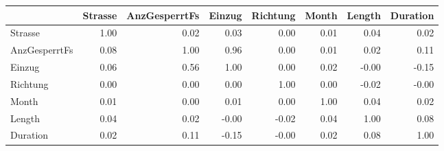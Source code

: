 \begin{tabular}{lrrrrrrr}
\toprule
{} &  Strasse &  AnzGesperrtFs &  Einzug &  Richtung &  Month &  Length &  Duration \\
\midrule
Strasse       &     1.00 &           0.02 &    0.03 &      0.00 &   0.01 &    0.04 &      0.02 \\
AnzGesperrtFs &     0.08 &           1.00 &    0.96 &      0.00 &   0.01 &    0.02 &      0.11 \\
Einzug        &     0.06 &           0.56 &    1.00 &      0.00 &   0.02 &   -0.00 &     -0.15 \\
Richtung      &     0.00 &           0.00 &    0.00 &      1.00 &   0.00 &   -0.02 &     -0.00 \\
Month         &     0.01 &           0.00 &    0.01 &      0.00 &   1.00 &    0.04 &      0.02 \\
Length        &     0.04 &           0.02 &   -0.00 &     -0.02 &   0.04 &    1.00 &      0.08 \\
Duration      &     0.02 &           0.11 &   -0.15 &     -0.00 &   0.02 &    0.08 &      1.00 \\
\bottomrule
\end{tabular}
